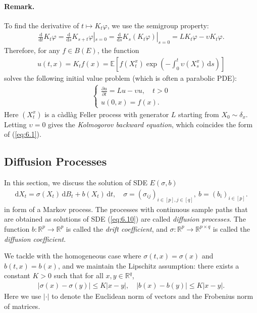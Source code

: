\documentclass{article}
\numberwithin{equation}{section}
\newcommand{\E}{\mathbb{E}}
\renewcommand{\d}{\mathrm{d}}
\theoremstyle{plain}
\theoremstyle{definition}
\begin{document}
\paragraph{Remark.} To find the derivative of $t\mapsto K_t\varphi$, we use the semigroup property:
\begin{align*}
	\frac{\d}{\d t}K_t\varphi = \frac{\d}{\d s}K_{s+t}\varphi|_{s=0} = \frac{\d}{\d s}K_s(K_t\varphi)|_{s=0} = LK_t\varphi - \upsilon K_t\varphi.
\end{align*}
Therefore, for any $f\in B(E)$, the function 
\begin{align*}
	u(t,x)=K_tf(x)=\E\left[f(X_t^x)\exp\left(-\int_0^t\upsilon(X_s^x)\,\d s\right)\right]
\end{align*} 
solves the following initial value problem (which is often a parabolic PDE):
\begin{align*}
\begin{cases}
	\displaystyle\frac{\partial u}{\partial t} = Lu-\upsilon u,\quad t>0\\ u(0,x)=f(x).
\end{cases}
\end{align*}
Here $(X_t^x)$ is a càdlàg Feller process with generator $L$ starting from $X_0\sim\delta_x$. Letting $\upsilon=0$ gives the \textit{Kolmogorov backward equation}, which coincides the form of (\ref{eq:6.1}).

\subsection{Diffusion Processes}
In this section, we discuss the solution of SDE $E(\sigma,b)$
\begin{align*}
	\d X_t = \sigma(X_t)\,\d B_t + b(X_t)\,\d t,\quad \sigma=(\sigma_{ij})_{i\in[p],j\in[q]},\ b=(b_i)_{i\in[p]}.\label{eq:6.10}\tag{6.10}
\end{align*} 
in form of a Markov process. The processes with continuous sample paths that are obtained as solutions
of SDE (\ref{eq:6.10}) are called \textit{diffusion processes}. The function $b:\mathbb{R}^p\to\mathbb{R}^p$ is called the \textit{drift coefficient}, and $\sigma:\mathbb{R}^p\to\mathbb{R}^{p\times q}$ is called the \textit{diffusion coefficient}.

We tackle with the homogeneous case where $\sigma(t,x)=\sigma(x)$ and $b(t,x)=b(x)$, and we maintain the Lipschitz assumption: there exists a constant $K>0$ such that for all $x,y\in\mathbb{R}^q$,
\begin{align*}
	\left\vert\sigma(x)-\sigma(y)\right\vert\leq K\vert x-y\vert,\quad \left\vert b(x)-b(y)\right\vert\leq K\vert x-y\vert.
\end{align*}
Here we use $\vert\cdot\vert$ to denote the Euclidean norm of vectors and the Frobenius norm of matrices.
\end{document}
